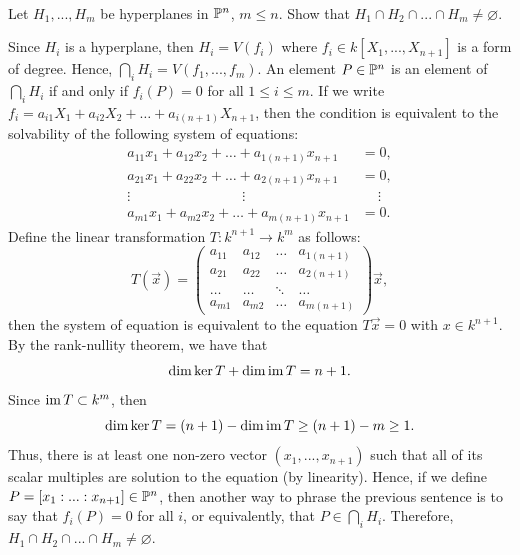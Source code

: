 \begin{solution}
    \td \\
\end{solution}

\begin{exercise}
    \td \\
\end{exercise}

\begin{solution}
    \td \\
\end{solution}

\begin{exercise}
    Let $H_1, ..., H_m$ be hyperplanes in $\P^n$, $m \leq n$. Show that $H_1 \cap H_2 \cap ... \cap H_m \neq \varnothing$. \\
\end{exercise}

\begin{solution}
    Since $H_i$ is a hyperplane, then $H_i = V(f_i)$ where $f_i \in k[X_1, ..., X_{n+1}]$ is a form of degree. Hence, $\bigcap_i H_i = V(f_1, ..., f_m)$. An element $P \in \P^n$ is an element of $\bigcap_i H_i$ if and only if $f_i(P) = 0$ for all $1 \leq i \leq m$. If we write $f_i = a_{i1}X_1 + a_{i2}X_2 + \dots + a_{i(n+1)}X_{n+1}$, then the condition is equivalent to the solvability of the following system of equations:
    \begin{align*}
        a_{11}x_1 + a_{12}x_2 + \dots + a_{1(n+1)}x_{n+1} &= 0, \\
        a_{21}x_1 + a_{22}x_2 + \dots + a_{2(n+1)}x_{n+1} &= 0, \\
        \vdots \qquad \qquad \qquad \qquad \vdots \qquad & \quad \ \vdots \\
        a_{m1}x_1 + a_{m2}x_2 + \dots + a_{m(n+1)}x_{n+1} &= 0.
    \end{align*}
    Define the linear transformation $T : k^{n+1} \to k^m$ as follows:
    $$T(\vec{x}) = \begin{pmatrix}
        a_{11} & a_{12} & \dots & a_{1(n+1)} \\
        a_{21} & a_{22} & \dots & a_{2(n+1)} \\
        \ldots & \ldots & \ddots & \ldots \\
        a_{m1} & a_{m2} & \dots & a_{m(n+1)}
    \end{pmatrix}\vec{x},$$
    then the system of equation is equivalent to the equation $T\vec{x} = 0$ with $x \in k^{n+1}$. By the rank-nullity theorem, we have that
    $$\dim \ker T + \dim \Ima T = n+1.$$
    Since $\Ima T \subset k^m$, then
    $$\dim \ker T = (n+1) - \dim \Ima T \geq (n+1) - m \geq 1.$$
    Thus, there is at least one non-zero vector $(x_1, ..., x_{n+1})$ such that all of its scalar multiples are solution to the equation (by linearity). Hence, if we define $P = [x_1 : ... : x_{n+1}] \in \P^n$, then another way to phrase the previous sentence is to say that $f_i(P) = 0$ for all $i$, or equivalently, that $P \in \bigcap_i H_i$. Therefore, $H_1 \cap H_2 \cap ... \cap H_m \neq \varnothing$. \\
\end{solution}

